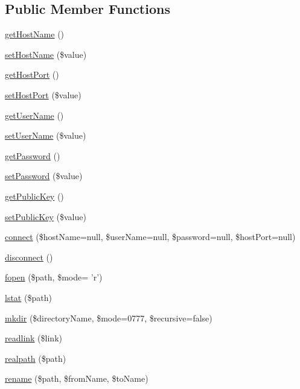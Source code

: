 \subsection*{Public Member Functions}
\begin{DoxyCompactItemize}
\item 
\hyperlink{classCPSSsh_ae78e05faf338016b4c1baeae80316a12}{getHostName} ()
\item 
\hyperlink{classCPSSsh_a0b9a6db81fce56df66374e0da839c18b}{setHostName} (\$value)
\item 
\hyperlink{classCPSSsh_a845fffe6111394d26fd5b336d5bdd9a2}{getHostPort} ()
\item 
\hyperlink{classCPSSsh_ace14fafdee989e8e2c63c97aba55e7a2}{setHostPort} (\$value)
\item 
\hyperlink{classCPSSsh_aafd6d1ef27e6acc5833aba4012e5ee77}{getUserName} ()
\item 
\hyperlink{classCPSSsh_a22f791d05aab2806e131af24487fd9ff}{setUserName} (\$value)
\item 
\hyperlink{classCPSSsh_a04e0957baeb7acde9c0c86556da2d43f}{getPassword} ()
\item 
\hyperlink{classCPSSsh_a1da155ea4c8dda7eb4cf986f05634003}{setPassword} (\$value)
\item 
\hyperlink{classCPSSsh_afc841edb470c7b8c50e78daaf634228a}{getPublicKey} ()
\item 
\hyperlink{classCPSSsh_a04c351b17c0fab37fd13de3badbf4d90}{setPublicKey} (\$value)
\item 
\hyperlink{classCPSSsh_af8437180fb9517471bed3d55b79893fb}{connect} (\$hostName=null, \$userName=null, \$password=null, \$hostPort=null)
\item 
\hyperlink{classCPSSsh_abe175fcf658475bc56e9d6fa02bc88ec}{disconnect} ()
\item 
\hyperlink{classCPSSsh_a38b50584ad0013c2476003f46a995e15}{fopen} (\$path, \$mode= 'r')
\item 
\hyperlink{classCPSSsh_ac35682e9c70da42914cd2078791b63e5}{lstat} (\$path)
\item 
\hyperlink{classCPSSsh_acc01f0607737714c1ef2caacfc7af6ce}{mkdir} (\$directoryName, \$mode=0777, \$recursive=false)
\item 
\hyperlink{classCPSSsh_aad9f6133b72f0213b3cb1d3a497083d9}{readlink} (\$link)
\item 
\hyperlink{classCPSSsh_a8d72a3f8e929f935fe69606f691c873a}{realpath} (\$path)
\item 
\hyperlink{classCPSSsh_a4d3ace76ac5651cc4b8e45ad72861422}{rename} (\$path, \$fromName, \$toName)

\end{DoxyCompactItemize}
